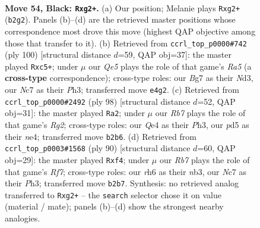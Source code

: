 \documentclass[11pt]{article}
\begin{document}
\clearpage

\begin{figure}[p]\centering
\begin{subfigure}{0.46\textwidth}\centering
\resizebox{\linewidth}{!}{%
\newchessgame
\chessboard[
  setfen={6k1/2n2pb1/7R/3P2R1/4q3/8/1r4N1/6K1 b - - 5 54},
  showmover=false,
  pgfstyle=straightmove, color=movearrow, markmove={b2-g2}
]}
\caption{}
\end{subfigure}\hfill
\begin{subfigure}{0.46\textwidth}\centering
\resizebox{\linewidth}{!}{%
\newchessgame
\chessboard[
  setfen={8/8/8/R1nk3p/p7/P1rNK2P/8/8 w - - 4 51},
  showmover=false,
  pgfstyle=straightmove, color=movearrow, markmove={a5-c5}
]}
\caption{}
\end{subfigure}
\\[4pt]
\begin{subfigure}{0.46\textwidth}\centering
\resizebox{\linewidth}{!}{%
\newchessgame
\chessboard[
  setfen={4R3/8/5k2/6p1/1Pr1n3/7P/6R1/r4BK1 w - - 0 50},
  showmover=false,
  pgfstyle=straightmove, color=movearrow, markmove={g2-a2}
]}
\caption{}
\end{subfigure}\hfill
\begin{subfigure}{0.46\textwidth}\centering
\resizebox{\linewidth}{!}{%
\newchessgame
\chessboard[
  setfen={8/5R1p/p6k/8/P1B2p2/1nr4P/8/6K1 w - - 2 46},
  showmover=false,
  pgfstyle=straightmove, color=movearrow, markmove={f7-f4}
]}
\caption{}
\end{subfigure}
\caption{\textbf{Move 54, Black: \texttt{Rxg2+}.} (a) Our position; Melanie plays \texttt{Rxg2+} (\texttt{b2g2}). Panels (b)--(d) are the retrieved master positions whose correspondence most drove this move (highest QAP objective among those that transfer to it). (b) Retrieved from \texttt{ccrl\_top\_p0000\#742} (ply 100) [structural distance $d$=59, QAP obj=37]: the master played \texttt{Rxc5+}; under $\mu$ our \emph{Qe5} plays the role of that game's \emph{Ra5} (a \textbf{cross-type} correspondence); cross-type roles: our \emph{B}g7 as their \emph{N}d3, our \emph{N}c7 as their \emph{P}h3; transferred move \texttt{e4g2}. (c) Retrieved from \texttt{ccrl\_top\_p0000\#2492} (ply 98) [structural distance $d$=52, QAP obj=31]: the master played \texttt{Ra2}; under $\mu$ our \emph{Rb7} plays the role of that game's \emph{Rg2}; cross-type roles: our \emph{Q}e4 as their \emph{P}h3, our \emph{p}d5 as their \emph{n}e4; transferred move \texttt{b2b6}. (d) Retrieved from \texttt{ccrl\_top\_p0003\#1568} (ply 90) [structural distance $d$=60, QAP obj=29]: the master played \texttt{Rxf4}; under $\mu$ our \emph{Rb7} plays the role of that game's \emph{Rf7}; cross-type roles: our \emph{r}h6 as their \emph{n}b3, our \emph{N}c7 as their \emph{P}h3; transferred move \texttt{b2b7}. Synthesis: no retrieved analog transferred to \texttt{Rxg2+} -- the \texttt{search} selector chose it on value (material / mate); panels (b)--(d) show the strongest nearby analogies.}
\label{fig:thought-m107}
\end{figure}
\end{document}
